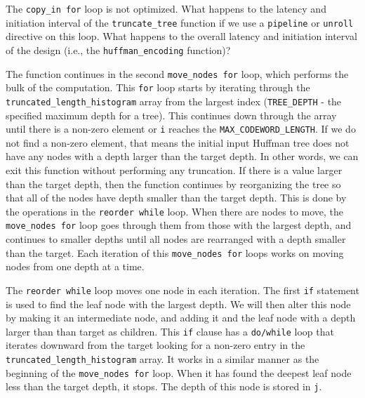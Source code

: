 \begin{exercise}
The \lstinline{copy_in for} loop is not optimized. What happens to the latency and initiation interval of the \lstinline{truncate_tree} function if we use a \lstinline{pipeline} or \lstinline{unroll} directive on this loop. What happens to the overall latency and initiation interval of the design (i.e., the \lstinline{huffman_encoding} function)?
\end{exercise}

The function continues in the second \lstinline{move_nodes for} loop, which performs the bulk of the computation. This \lstinline{for} loop starts by iterating through the \lstinline{truncated_length_histogram} array from the largest index (\lstinline{TREE_DEPTH} - the specified maximum depth for a tree). This continues down through the array until there is a non-zero element or \lstinline{i} reaches the \lstinline{MAX_CODEWORD_LENGTH}. If we do not find a non-zero element, that means the initial input Huffman tree does not have any nodes with a depth larger than the target depth. In other words, we can exit this function without performing any truncation. If there is a value larger than the target depth, then the function continues by reorganizing the tree so that all of the nodes have depth smaller than the target depth. This is done by the operations in the \lstinline{reorder while} loop. When there are nodes to move, the \lstinline{move_nodes for} loop goes through them from those with the largest depth, and continues to smaller depths until all nodes are rearranged with a depth smaller than the target. Each iteration of this \lstinline{move_nodes for} loops works on moving nodes from one depth at a time.

The \lstinline{reorder while} loop moves one node in each iteration. The first \lstinline{if} statement is used to find the leaf node with the largest depth. We will then alter this node by making it an intermediate node, and adding it and the leaf node with a depth larger than than target as children. This \lstinline{if} clause has a \lstinline{do/while} loop that iterates downward from the target looking for a non-zero entry in the \lstinline{truncated_length_histogram} array. It works in a similar manner as the beginning of the \lstinline{move_nodes for} loop. When it has found the deepest leaf node less than the target depth, it stops. The depth of this node is stored in \lstinline{j}.

